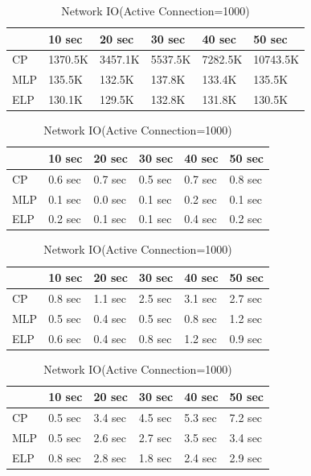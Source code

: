 \begin{table}
\centering \caption{\label{tb:traffic} Network IO(Active Connection=1000)}
\begin{tabular}{|l|l|l|l|l|l|}
    \hline & 10 sec & 20 sec & 30 sec & 40 sec & 50 sec \\
    \hline CP & 1370.5K & 3457.1K & 5537.5K & 7282.5K & 10743.5K \\
    \hline MLP & 135.5K & 132.5K & 137.8K & 133.4K & 135.5K \\
    \hline ELP & 130.1K & 129.5K & 132.8K & 131.8K & 130.5K \\
    \hline
\end{tabular}
\end{table}

\begin{table}
\centering \caption{\label{tb:traffic} Network IO(Active Connection=1000)}
\begin{tabular}{|l|l|l|l|l|l|}
    \hline & 10 sec & 20 sec & 30 sec & 40 sec & 50 sec \\
    \hline CP & 0.6 sec & 0.7 sec & 0.5 sec & 0.7 sec & 0.8 sec \\
    \hline MLP & 0.1 sec & 0.0 sec & 0.1 sec & 0.2 sec & 0.1 sec \\
    \hline ELP & 0.2 sec & 0.1 sec & 0.1 sec & 0.4 sec & 0.2 sec \\
    \hline
\end{tabular}
\end{table}

\begin{table}
\centering \caption{\label{tb:traffic} Network IO(Active Connection=1000)}
\begin{tabular}{|l|l|l|l|l|l|}
    \hline & 10 sec & 20 sec & 30 sec & 40 sec & 50 sec \\
    \hline CP & 0.8 sec & 1.1 sec & 2.5 sec & 3.1 sec & 2.7 sec \\
    \hline MLP & 0.5 sec & 0.4 sec & 0.5 sec & 0.8 sec & 1.2 sec \\
    \hline ELP & 0.6 sec & 0.4 sec & 0.8 sec & 1.2 sec & 0.9 sec \\
    \hline
\end{tabular}
\end{table}

\begin{table}
\centering \caption{\label{tb:traffic} Network IO(Active Connection=1000)}
\begin{tabular}{|l|l|l|l|l|l|}
    \hline  & 10 sec & 20 sec & 30 sec & 40 sec & 50 sec \\
    \hline CP & 0.5 sec & 3.4 sec & 4.5 sec & 5.3 sec & 7.2 sec \\
    \hline MLP & 0.5 sec & 2.6 sec & 2.7 sec & 3.5 sec & 3.4 sec \\
    \hline ELP & 0.8 sec & 2.8 sec & 1.8 sec & 2.4 sec & 2.9 sec \\
    \hline
\end{tabular}
\end{table}

